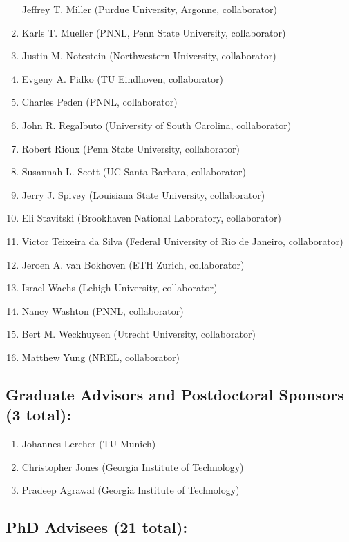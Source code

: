 \begin{enumerate}
  Jeffrey T. Miller (Purdue University, Argonne, collaborator)
\item
  Karls T. Mueller (PNNL, Penn State University, collaborator)
\item
  Justin M. Notestein (Northwestern University, collaborator)
\item
  Evgeny A. Pidko (TU Eindhoven, collaborator)
\item
  Charles Peden (PNNL, collaborator)
\item
  John R. Regalbuto (University of South Carolina, collaborator)
\item
  Robert Rioux (Penn State University, collaborator)
\item
  Susannah L. Scott (UC Santa Barbara, collaborator)
\item
  Jerry J. Spivey (Louisiana State University, collaborator)
\item
  Eli Stavitski (Brookhaven National Laboratory, collaborator)
\item
  Victor Teixeira da Silva (Federal University of Rio de Janeiro,
  collaborator)
\item
  Jeroen A. van Bokhoven (ETH Zurich, collaborator)
\item
  Israel Wachs (Lehigh University, collaborator)
\item
  Nancy Washton (PNNL, collaborator)
\item
  Bert M. Weckhuysen (Utrecht University, collaborator)
\item
  Matthew Yung (NREL, collaborator)
\end{enumerate}

\subsection{Graduate Advisors and Postdoctoral Sponsors (3 total):}

\begin{enumerate}
\item
  Johannes Lercher (TU Munich)
\item
  Christopher Jones (Georgia Institute of Technology)
\item
  Pradeep Agrawal (Georgia Institute of Technology)
\end{enumerate}

\subsection{PhD Advisees (21 total):}

